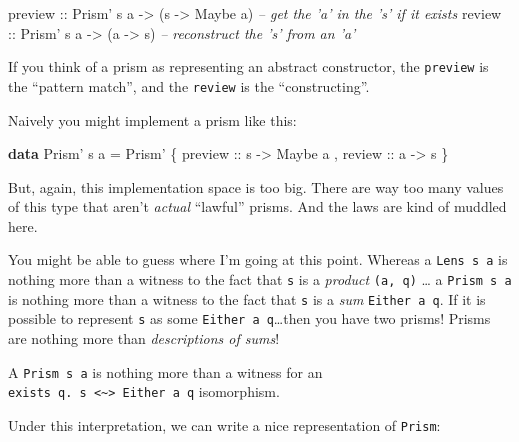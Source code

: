 \documentclass[]{article}
\newenvironment{Shaded}{}{}
\newcommand{\CommentTok}[1]{\textcolor[rgb]{0.38,0.63,0.69}{\textit{#1}}}
\newcommand{\DataTypeTok}[1]{\textcolor[rgb]{0.56,0.13,0.00}{#1}}
\newcommand{\FunctionTok}[1]{\textcolor[rgb]{0.02,0.16,0.49}{#1}}
\newcommand{\KeywordTok}[1]{\textcolor[rgb]{0.00,0.44,0.13}{\textbf{#1}}}
\newcommand{\NormalTok}[1]{#1}
\newcommand{\OtherTok}[1]{\textcolor[rgb]{0.00,0.44,0.13}{#1}}
\begin{document}
\begin{Shaded}
\begin{Highlighting}[]
\OtherTok{preview ::} \DataTypeTok{Prism'}\NormalTok{ s a }\OtherTok{->}\NormalTok{ (s }\OtherTok{->} \DataTypeTok{Maybe}\NormalTok{ a)   }\CommentTok{-- get the 'a' in the 's' if it exists}
\OtherTok{review  ::} \DataTypeTok{Prism'}\NormalTok{ s a }\OtherTok{->}\NormalTok{ (a }\OtherTok{->}\NormalTok{ s)         }\CommentTok{-- reconstruct the 's' from an 'a'}
\end{Highlighting}
\end{Shaded}

If you think of a prism as representing an abstract constructor, the
\texttt{preview} is the ``pattern match'', and the \texttt{review} is the
``constructing''.

Naively you might implement a prism like this:

\begin{Shaded}
\begin{Highlighting}[]
\KeywordTok{data} \DataTypeTok{Prism'}\NormalTok{ s a }\FunctionTok{=} \DataTypeTok{Prism'}
\NormalTok{    \{}\OtherTok{ preview ::}\NormalTok{ s }\OtherTok{->} \DataTypeTok{Maybe}\NormalTok{ a}
\NormalTok{    ,}\OtherTok{ review  ::}\NormalTok{ a }\OtherTok{->}\NormalTok{ s}
\NormalTok{    \}}
\end{Highlighting}
\end{Shaded}

But, again, this implementation space is too big. There are way too many values
of this type that aren't \emph{actual} ``lawful'' prisms. And the laws are kind
of muddled here.

You might be able to guess where I'm going at this point. Whereas a
\texttt{Lens\textquotesingle{}\ s\ a} is nothing more than a witness to the fact
that \texttt{s} is a \emph{product} \texttt{(a,\ q)} \ldots{} a
\texttt{Prism\textquotesingle{}\ s\ a} is nothing more than a witness to the
fact that \texttt{s} is a \emph{sum} \texttt{Either\ a\ q}. If it is possible to
represent \texttt{s} as some \texttt{Either\ a\ q}\ldots{}then you have two
prisms! Prisms are nothing more than \emph{descriptions of sums}!

A \texttt{Prism\textquotesingle{}\ s\ a} is nothing more than a witness for an
\texttt{exists\ q.\ s\ \textless{}\textasciitilde{}\textgreater{}\ Either\ a\ q}
isomorphism.

Under this interpretation, we can write a nice representation of
\texttt{Prism\textquotesingle{}}:
\end{document}
